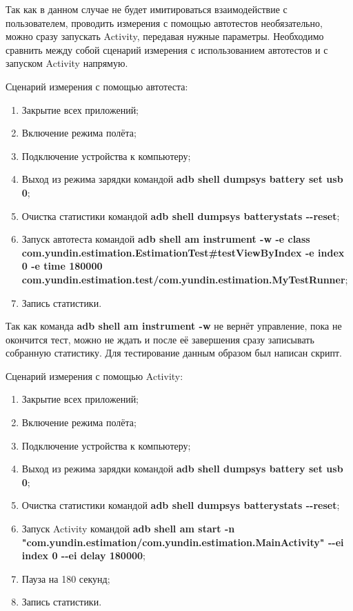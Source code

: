 \documentclass[a4paper,14pt]{extarticle} %
\begin{document}
	Так как в данном случае не будет имитироваться взаимодействие с пользователем, проводить измерения с помощью автотестов необязательно, можно сразу запускать Activity, передавая нужные параметры. Необходимо сравнить между собой сценарий измерения с использованием автотестов и с запуском Activity напрямую.
	
	Сценарий измерения с помощью автотеста:
	\begin{enumerate}
		\item Закрытие всех приложений;
		\item Включение режима полёта;
		\item Подключение устройства к компьютеру;
		\item Выход из режима зарядки командой \textbf{adb shell dumpsys battery set usb 0};
		\item Очистка статистики командой \textbf{adb shell dumpsys batterystats -{}-reset};
		\item Запуск автотеста командой \textbf{adb shell am instrument -w -e class com.yundin.estimation.EstimationTest\#testViewByIndex -e index 0 -e time 180000 com.yundin.estimation.test/com.yundin.estimation.MyTestRunner};
		\item Запись статистики.
	\end{enumerate}
	
	Так как команда \textbf{adb shell am instrument -w} не вернёт управление, пока не окончится тест, можно не ждать и после её завершения сразу записывать собранную статистику. Для тестирование данным образом был написан скрипт.
	
	Сценарий измерения с помощью Activity:
	\begin{enumerate}
		\item Закрытие всех приложений;
		\item Включение режима полёта;
		\item Подключение устройства к компьютеру;
		\item Выход из режима зарядки командой \textbf{adb shell dumpsys battery set usb 0};
		\item Очистка статистики командой \textbf{adb shell dumpsys batterystats -{}-reset};
		\item Запуск Activity командой \textbf{adb shell am start -n "com.yundin.estimation/com.yundin.estimation.MainActivity" -{}-ei index 0 -{}-ei delay 180000};
		\item Пауза на 180 секунд;
		\item Запись статистики.
	\end{enumerate}
\end{document}
